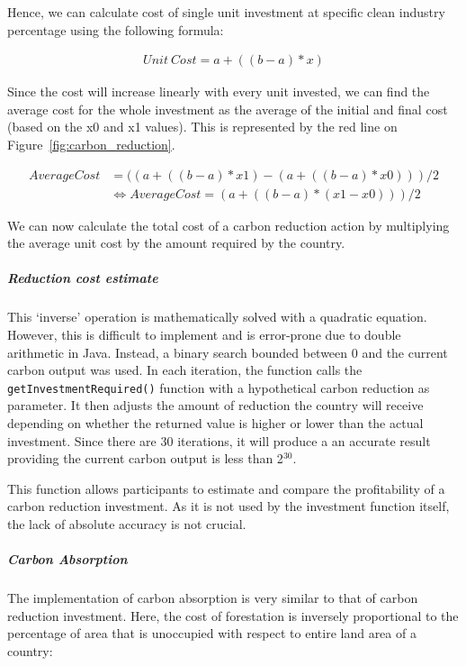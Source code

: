  
Hence, we can calculate cost of single unit investment at specific clean industry percentage using the following formula:

\begin{align*}
Unit~Cost = a + ((b - a) * x)
\end{align*}

%
%

Since the cost will increase linearly with every unit invested, we can find the average cost for the whole investment as the average of the initial and final cost (based on the x0 and x1 values). This is represented by the red line on Figure~\ref{fig:carbon_reduction}.
 
\begin{align*}
Average Cost &= ((a + ((b - a) * x1) - (a + ((b-a) * x0))) / 2 \\
&\Leftrightarrow Average  Cost = (a + ((b - a) * (x1 - x0))) / 2
\end{align*}

We can now calculate the total cost of a carbon reduction action by multiplying the average unit cost by the amount required by the country.

\subparagraph{Reduction cost estimate}

This `inverse' operation is mathematically solved with a quadratic equation. However, this is difficult to implement and is error-prone due to double arithmetic in Java. Instead, a binary search bounded between 0 and the current carbon output was used. In each iteration, the function calls the \texttt{getInvestmentRequired()} function with a hypothetical carbon reduction as parameter. It then adjusts the amount of reduction the country will receive depending on whether the returned value is higher or lower than the actual investment. Since there are 30 iterations, it will produce a an accurate result providing the current carbon output is less than 2$^{30}$.
  
This function allows participants to estimate and compare the profitability of a carbon reduction investment. As it is not used by the investment function itself, the lack of absolute accuracy is not crucial.

\subparagraph{Carbon Absorption}

The implementation of carbon absorption is very similar to that of carbon reduction investment. Here, the cost of forestation is inversely proportional to the percentage of area that is unoccupied with respect to entire land area of a country:

